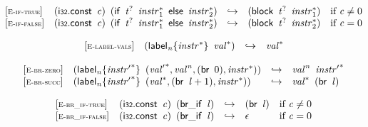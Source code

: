 $$
\begin{array}{@{}l@{}lcl@{}l@{}}
{[\textsc{\scriptsize E{-}if{-}true}]} \quad & (\mathsf{i{\scriptstyle32}}.\mathsf{const}~\,{\mathit{c}})~\,(\mathsf{if}~\,{{\mathit{t}}^?}~\,{{\mathit{instr}}_{{1}}^\ast}~\,\mathsf{else}~\,{{\mathit{instr}}_{{2}}^\ast}) &\hookrightarrow& (\mathsf{block}~\,{{\mathit{t}}^?}~\,{{\mathit{instr}}_{{1}}^\ast}) &\quad
  \mbox{if}~{\mathit{c}} \neq 0 \\
{[\textsc{\scriptsize E{-}if{-}false}]} \quad & (\mathsf{i{\scriptstyle32}}.\mathsf{const}~\,{\mathit{c}})~\,(\mathsf{if}~\,{{\mathit{t}}^?}~\,{{\mathit{instr}}_{{1}}^\ast}~\,\mathsf{else}~\,{{\mathit{instr}}_{{2}}^\ast}) &\hookrightarrow& (\mathsf{block}~\,{{\mathit{t}}^?}~\,{{\mathit{instr}}_{{2}}^\ast}) &\quad
  \mbox{if}~{\mathit{c}} = 0 \\
\end{array}
$$

\vspace{1ex}

$$
\begin{array}{@{}l@{}lcl@{}l@{}}
{[\textsc{\scriptsize E{-}label{-}vals}]} \quad & ({{\mathsf{label}}_{{\mathit{n}}}}{\{{{\mathit{instr}}^\ast}\}}~\,{{\mathit{val}}^\ast}) &\hookrightarrow& {{\mathit{val}}^\ast} &  \\
\end{array}
$$

\vspace{1ex}

$$
\begin{array}{@{}l@{}lcl@{}l@{}}
{[\textsc{\scriptsize E{-}br{-}zero}]} \quad & ({{\mathsf{label}}_{{\mathit{n}}}}{\{{{\mathit{instr}'}^\ast}\}}~\,({{\mathit{val}'}^\ast}, {{\mathit{val}}^{{\mathit{n}}}}, (\mathsf{br}~\,0), {{\mathit{instr}}^\ast})) &\hookrightarrow& {{\mathit{val}}^{{\mathit{n}}}}~\,{{\mathit{instr}'}^\ast} &  \\
{[\textsc{\scriptsize E{-}br{-}succ}]} \quad & ({{\mathsf{label}}_{{\mathit{n}}}}{\{{{\mathit{instr}'}^\ast}\}}~\,({{\mathit{val}}^\ast}, (\mathsf{br}~\,{\mathit{l}} + 1), {{\mathit{instr}}^\ast})) &\hookrightarrow& {{\mathit{val}}^\ast}~\,(\mathsf{br}~\,{\mathit{l}}) &  \\
\end{array}
$$

\vspace{1ex}

$$
\begin{array}{@{}l@{}lcl@{}l@{}}
{[\textsc{\scriptsize E{-}br\_if{-}true}]} \quad & (\mathsf{i{\scriptstyle32}}.\mathsf{const}~\,{\mathit{c}})~\,(\mathsf{br\_if}~\,{\mathit{l}}) &\hookrightarrow& (\mathsf{br}~\,{\mathit{l}}) &\quad
  \mbox{if}~{\mathit{c}} \neq 0 \\
{[\textsc{\scriptsize E{-}br\_if{-}false}]} \quad & (\mathsf{i{\scriptstyle32}}.\mathsf{const}~\,{\mathit{c}})~\,(\mathsf{br\_if}~\,{\mathit{l}}) &\hookrightarrow& \epsilon &\quad
  \mbox{if}~{\mathit{c}} = 0 \\
\end{array}
$$

